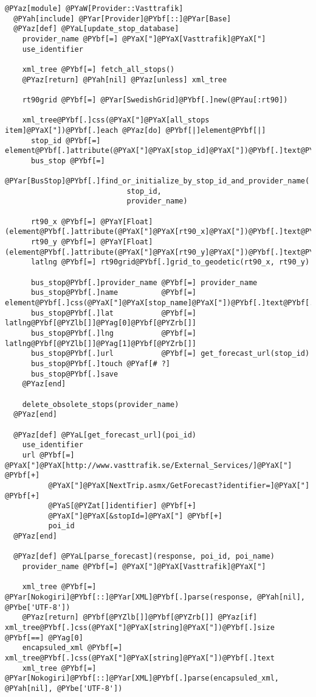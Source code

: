\begin{Verbatim}[commandchars=@\[\]]
@PYaz[module] @PYaW[Provider::Vasttrafik]
  @PYah[include] @PYar[Provider]@PYbf[::]@PYar[Base]
  @PYaz[def] @PYaL[update_stop_database]
    provider_name @PYbf[=] @PYaX["]@PYaX[Vasttrafik]@PYaX["]
    use_identifier

    xml_tree @PYbf[=] fetch_all_stops()
    @PYaz[return] @PYah[nil] @PYaz[unless] xml_tree

    rt90grid @PYbf[=] @PYar[SwedishGrid]@PYbf[.]new(@PYau[:rt90])

    xml_tree@PYbf[.]css(@PYaX["]@PYaX[all_stops item]@PYaX["])@PYbf[.]each @PYaz[do] @PYbf[|]element@PYbf[|]
      stop_id @PYbf[=] element@PYbf[.]attribute(@PYaX["]@PYaX[stop_id]@PYaX["])@PYbf[.]text@PYbf[.]to_s
      bus_stop @PYbf[=] 
           @PYar[BusStop]@PYbf[.]find_or_initialize_by_stop_id_and_provider_name(
                            stop_id,
                            provider_name)

      rt90_x @PYbf[=] @PYaY[Float](element@PYbf[.]attribute(@PYaX["]@PYaX[rt90_x]@PYaX["])@PYbf[.]text@PYbf[.]to_s)
      rt90_y @PYbf[=] @PYaY[Float](element@PYbf[.]attribute(@PYaX["]@PYaX[rt90_y]@PYaX["])@PYbf[.]text@PYbf[.]to_s)
      latlng @PYbf[=] rt90grid@PYbf[.]grid_to_geodetic(rt90_x, rt90_y)

      bus_stop@PYbf[.]provider_name @PYbf[=] provider_name
      bus_stop@PYbf[.]name          @PYbf[=] element@PYbf[.]css(@PYaX["]@PYaX[stop_name]@PYaX["])@PYbf[.]text@PYbf[.]to_s
      bus_stop@PYbf[.]lat           @PYbf[=] latlng@PYbf[@PYZlb[]]@PYag[0]@PYbf[@PYZrb[]]
      bus_stop@PYbf[.]lng           @PYbf[=] latlng@PYbf[@PYZlb[]]@PYag[1]@PYbf[@PYZrb[]]
      bus_stop@PYbf[.]url           @PYbf[=] get_forecast_url(stop_id)
      bus_stop@PYbf[.]touch @PYaf[# ?]
      bus_stop@PYbf[.]save
    @PYaz[end]

    delete_obsolete_stops(provider_name)
  @PYaz[end]

  @PYaz[def] @PYaL[get_forecast_url](poi_id)
    use_identifier
    url @PYbf[=] @PYaX["]@PYaX[http://www.vasttrafik.se/External_Services/]@PYaX["] @PYbf[+]
          @PYaX["]@PYaX[NextTrip.asmx/GetForecast?identifier=]@PYaX["] @PYbf[+]
          @PYaS[@PYZat[]identifier] @PYbf[+]
          @PYaX["]@PYaX[&stopId=]@PYaX["] @PYbf[+]
          poi_id
  @PYaz[end]
  
  @PYaz[def] @PYaL[parse_forecast](response, poi_id, poi_name)
    provider_name @PYbf[=] @PYaX["]@PYaX[Vasttrafik]@PYaX["]

    xml_tree @PYbf[=] @PYar[Nokogiri]@PYbf[::]@PYar[XML]@PYbf[.]parse(response, @PYah[nil], @PYbe['UTF-8'])
    @PYaz[return] @PYbf[@PYZlb[]]@PYbf[@PYZrb[]] @PYaz[if] xml_tree@PYbf[.]css(@PYaX["]@PYaX[string]@PYaX["])@PYbf[.]size @PYbf[==] @PYag[0]
    encapsuled_xml @PYbf[=] xml_tree@PYbf[.]css(@PYaX["]@PYaX[string]@PYaX["])@PYbf[.]text
    xml_tree @PYbf[=] @PYar[Nokogiri]@PYbf[::]@PYar[XML]@PYbf[.]parse(encapsuled_xml, @PYah[nil], @PYbe['UTF-8'])
    

\end{Verbatim}
